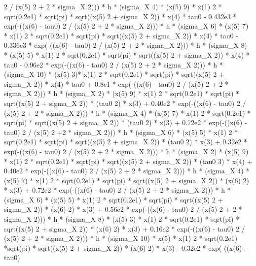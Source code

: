 \begin{maplegroup}
 2 / (x(5)  2 + 2 * sigma\_X  2))) * h * (sigma\_X  4) * (x(5)  9) * x(1)  2 * sqrt(0.2e1) * sqrt(pi) * sqrt((x(5)  2 + sigma\_X  2)) * x(4) * tau0 - 0.432e3 * exp(-((x(6) - tau0)  2 / (x(5)  2 + 2 * sigma\_X  2))) * h * (sigma\_X  6) * (x(5)  7) * x(1)  2 * sqrt(0.2e1) * sqrt(pi) * sqrt((x(5)  2 + sigma\_X  2)) * x(4) * tau0 - 0.336e3 * exp(-((x(6) - tau0)  2 / (x(5)  2 + 2 * sigma\_X  2))) * h * (sigma\_X  8) * (x(5)  5) * x(1)  2 * sqrt(0.2e1) * sqrt(pi) * sqrt((x(5)  2 + sigma\_X  2)) * x(4) * tau0 - 0.96e2 * exp(-((x(6) - tau0)  2 / (x(5)  2 + 2 * sigma\_X  2))) * h * (sigma\_X  10) * (x(5)  3)* x(1)  2 * sqrt(0.2e1) * sqrt(pi) * sqrt((x(5)  2 + sigma\_X  2)) * x(4) * tau0 + 0.8e1 * exp(-((x(6) - tau0)  2 / (x(5)  2 + 2 * sigma\_X  2))) * h * (sigma\_X  2) * (x(5)  9) * x(1)  2 * sqrt(0.2e1) * sqrt(pi) * sqrt((x(5)  2 + sigma\_X  2)) * (tau0  2) * x(3) + 0.40e2 * exp(-((x(6) - tau0)  2 / (x(5)  2 + 2 * sigma\_X  2))) * h * (sigma\_X  4) * (x(5)  7) * x(1)  2 * sqrt(0.2e1) * sqrt(pi) * sqrt((x(5)  2 + sigma\_X  2)) * (tau0  2) * x(3) + 0.72e2 * exp(-((x(6) - tau0)  2 / (x(5)  2 +2 * sigma\_X  2))) * h * (sigma\_X  6) * (x(5)  5) * x(1)  2 * sqrt(0.2e1) * sqrt(pi) * sqrt((x(5)  2 + sigma\_X  2)) * (tau0  2) * x(3) + 0.32e2 * exp(-((x(6) - tau0)  2 / (x(5)  2 + 2 * sigma\_X  2))) * h * (sigma\_X  2) * (x(5)  9) * x(1)  2 * sqrt(0.2e1) * sqrt(pi) * sqrt((x(5)  2 + sigma\_X  2)) * (tau0  3) * x(4) + 0.40e2 * exp(-((x(6) - tau0)  2 / (x(5)  2 + 2 * sigma\_X  2))) * h * (sigma\_X  4) * (x(5)  7) * x(1)  2 * sqrt(0.2e1) * sqrt(pi) * sqrt((x(5)  2 + sigma\_X  2)) * (x(6)  2) * x(3) + 0.72e2 * exp(-((x(6) - tau0)  2 / (x(5)  2 + 2 * sigma\_X  2))) * h * (sigma\_X  6) * (x(5)  5) * x(1)  2 * sqrt(0.2e1) * sqrt(pi) * sqrt((x(5)  2 + sigma\_X  2)) * (x(6)  2) * x(3) + 0.56e2 * exp(-((x(6) - tau0)  2 / (x(5)  2 + 2 * sigma\_X  2))) * h * (sigma\_X  8) * (x(5)  3) * x(1)  2 * sqrt(0.2e1) * sqrt(pi) * sqrt((x(5)  2 + sigma\_X  2)) * (x(6)  2) * x(3) + 0.16e2 * exp(-((x(6) - tau0)  2 / (x(5)  2 + 2 * sigma\_X  2))) * h * (sigma\_X  10) * x(5) * x(1)  2 * sqrt(0.2e1) *sqrt(pi) * sqrt((x(5)  2 + sigma\_X  2)) * (x(6)  2) * x(3) - 0.32e2 * exp(-((x(6) - tau0) 
\end{maplegroup}
